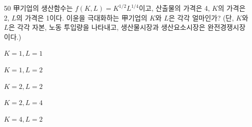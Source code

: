 \begin{question}{50}
甲기업의 생산함수는 $f(K,L)=K^{1/2}L^{1/4}$이고, 산출물의 가격은 4, $K$의 가격은 2, $L$의 가격은 1이다. 이윤을 극대화하는 甲기업의 $K$와 $L$은 각각 얼마인가? (단, $K$와 $L$은 각각 자본, 노동 투입량을 나타내고, 생산물시장과 생산요소시장은 완전경쟁시장이다.)
\begin{choices}
  \item $K=1, L=1$
  \item $K=1, L=2$
  \item $K=2, L=2$
  \item $K=2, L=4$
  \item $K=4, L=2$
\end{choices}
\end{question}
